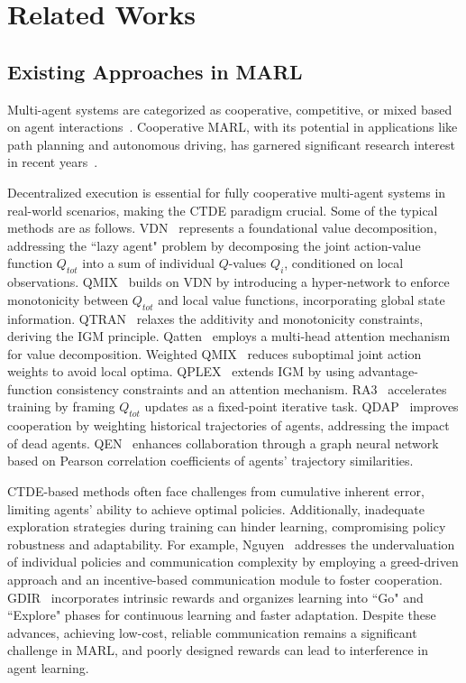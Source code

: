 \section{Related Works}
\subsection{Existing Approaches in MARL}
Multi-agent systems are categorized as cooperative, competitive, or mixed based on agent interactions~\cite{wong2023deep}. Cooperative MARL, with its potential in applications like path planning and autonomous driving, has garnered significant research interest in recent years~\cite{oroojlooy2023review}.

Decentralized execution is essential for fully cooperative multi-agent systems in real-world scenarios, making the CTDE paradigm crucial. Some of the typical methods are as follows. VDN~\cite{10.5555/3237383.3238080} represents a foundational value decomposition, addressing the ``lazy agent" problem by decomposing the joint action-value function $Q_{tot}$ into a sum of individual $Q$-values $Q_i$, conditioned on local observations. QMIX~\cite{rashid2020monotonic} builds on VDN by introducing a hyper-network to enforce monotonicity between $Q_{tot}$ and local value functions, incorporating global state information. QTRAN~\cite{son2019qtran} relaxes the additivity and monotonicity constraints, deriving the IGM principle. Qatten~\cite{yang2020qatten} employs a multi-head attention mechanism for value decomposition. Weighted QMIX~\cite{rashid2020weighted} reduces suboptimal joint action weights to avoid local optima. QPLEX~\cite{wang2020qplex} extends IGM by using advantage-function consistency constraints and an attention mechanism. RA3~\cite{wang2023regularization} accelerates training by framing $Q_{tot}$ updates as a fixed-point iterative task. QDAP~\cite{zhao2024qdap} improves cooperation by weighting historical trajectories of agents, addressing the impact of dead agents. QEN~\cite{wang2024enhancing} enhances collaboration through a graph neural network based on Pearson correlation coefficients of agents’ trajectory similarities.

CTDE-based methods often face challenges from cumulative inherent error, limiting agents' ability to achieve optimal policies. Additionally, inadequate exploration strategies during training can hinder learning, compromising policy robustness and adaptability. For example, Nguyen~\cite{huang2024optimistic} addresses the undervaluation of individual policies and communication complexity by employing a greed-driven approach and an incentive-based communication module to foster cooperation. GDIR~\cite{tan2023goexplore} incorporates intrinsic rewards and organizes learning into ``Go" and ``Explore" phases for continuous learning and faster adaptation. Despite these advances, achieving low-cost, reliable communication remains a significant challenge in MARL, and poorly designed rewards can lead to interference in agent learning.

